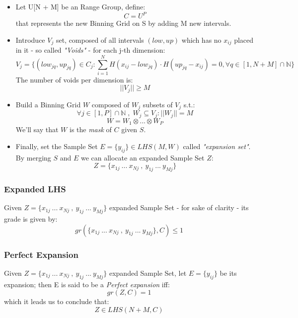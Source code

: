 \documentclass{article}
\begin{document}
\begin{itemize}[label=$\bullet$]
\item 	
	Let U[N + M] be an Range Group, define:
	\begin{equation}
	C = U^P
	\end{equation}
	that represents the new Binning Grid on S by adding M new intervals.
\item
	Introduce $V_j$ set, composed of all intervals $(low, up)$ which has no $x_{ij}$ placed in it - so called \textit{"Voids"} - for each j-th dimension:
	\begin{equation}
	V_j = \{(low_{jq}, up_{jq}) \in C_j : \sum^N_{i=1} H(x_{ij} - low_{jq}) \cdot H(up_{jq} - x_{ij}) = 0 , \forall q \in [1, N+M]\cap\mathbb{N}\}
	\end{equation}
	The number of voids per dimension is:
	\begin{equation*}
	|| V_j || \geq M
	\end{equation*}
	
\item 
	Build a Binning Grid $W$ composed of $W_j$ subsets of $V_j$ s.t.:
	\begin{equation*}
	\forall j \in [1, P]\cap\mathbb{N} \;,\; W_j \subseteq V_j : || W_j || =  M
	\end{equation*}
	\begin{equation}
	W = W_1 \otimes ... \otimes W_P 
	\end{equation}
	We'll say that $W$ is the \textit{mask} of $C$ given $S$. 

\item Finally, set the Sample Set $E = \{y_{ij}\} \in LHS(M, W)$ called \textit{"expansion set"}. By merging $S$ and $E$ we can allocate an expanded Sample Set $Z$:
	\begin{equation*}
	Z = \{x_{1j} \: ... \: x_{Nj}\:,\: y_{1j} \: ... \: y_{Mj}\}
	\end{equation*}
\end{itemize}
\subsubsection{Expanded LHS}
Given $Z = \{x_{1j} \: ... \: x_{Nj}\:,\: y_{1j} \: ... \: y_{Mj}\}$ expanded Sample Set - for sake of clarity - its grade is given by:
\begin{equation}
gr(\{x_{1j} \: ... \: x_{Nj}\:,\: y_{1j} \: ... \: y_{Mj}\}, C) \leq 1
\end{equation}

\subsubsection{Perfect Expansion}
Given $Z = \{x_{1j} \: ... \: x_{Nj}\:,\: y_{1j} \: ... \: y_{Mj}\}$ expanded Sample Set, let $E = \{y_{ij}\}$ be its expansion; then E is said to be a \textit{Perfect expansion} iff:
\begin{equation}
gr(Z, C) = 1
\end{equation}
which it leads us to conclude that:
\begin{equation}
Z \in LHS(N + M, C)
\end{equation}
\end{document}
